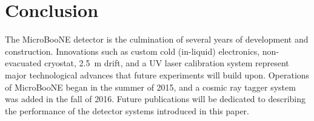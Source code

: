 \section{Conclusion}
\label{sec:conclusion}

The MicroBooNE detector is the culmination of several years of development and construction.  Innovations such as custom cold (in-liquid) electronics, non-evacuated cryostat, 2.5~m drift, and a UV laser calibration system represent major technological advances that future experiments will build upon.  Operations of MicroBooNE began in the summer of 2015, and a cosmic ray tagger system was added in the fall of 2016.  Future publications will be dedicated to describing the performance of the detector systems introduced in this paper.